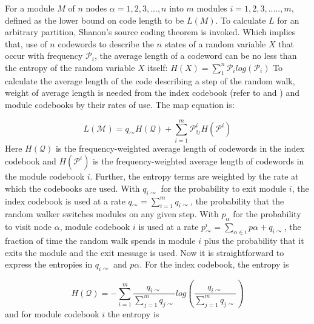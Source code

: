 For a module $M$ of $n$ nodes $\alpha = 1,2,3,...,n$ into $m$
modules $i = 1,2,3,.....,m$, defined as the lower bound on code length to be $L(M)$. To calculate $L$ for an arbitrary partition, Shanon's source coding theorem \cite{ref-45} is invoked. Which implies that, use of $n$ codewords to describe the $n$ states of a random variable $X$ that occur with frequency $\mathcal{P}_i$, the average length of a codeword can be no less than the entropy of the random variable $X$ itself:
$H(X) = \sum_{1}^{n}\mathcal{P}_i log(\mathcal{P}_i)$
To calculate the average length of the code describing a step of the random walk, weight of average length is needed from the index codebook ({refer to \cite{ref-44} and \cite{ref-43}}) and module codebooks by their rates of use. The map equation is:

\begin{equation}\label{eq:infomap_map_equation}
L(\mathcal{M}) = q_\curvearrowright H(\mathcal{Q}) + \sum_{i=1}^m \mathcal{P}_\circlearrowright^i H(\mathcal{P}^i)
\end{equation}
Here $H(\mathcal{Q})$ is the frequency-weighted average length of codewords in the index codebook and $H(\mathcal{P}^i)$ is the frequency-weighted average length of codewords in the module codebook $i$. Further, the entropy terms are weighted by the rate at which the codebooks are used. With $q_{i\curvearrowright}$ for the probability to exit module $i$, the index codebook is used at a rate $q_{\curvearrowright} = \sum_{i=1}^{m} q_{i\curvearrowright}$, the probability that the random walker switches modules on any given step. With $p_\alpha$ for the probability to visit node $\alpha$, module codebook $i$ is used at a rate $p_{\curvearrowright}^i = \sum_{\alpha \in i} p\alpha + q_{i\curvearrowright}$, the fraction of time the random walk spends in module $i$ plus the probability that it exits the module and the exit message is used. Now it is straightforward to express the entropies in $q_{i\curvearrowright}$ and $p\alpha$. For the index codebook, the entropy is

\begin{equation}\label{eq:infomap_index_entropy}
H(\mathcal{Q}) = - \sum_{i=1}^{m} \dfrac{q_{i\curvearrowright}}{\sum_{j=1}^{m}q_{j\curvearrowright}} log \left(\dfrac{q_{i\curvearrowright}}{\sum_{j=1}^{m} q_{j\curvearrowright}}\right)
\end{equation}
and for module codebook $i$ the entropy is

